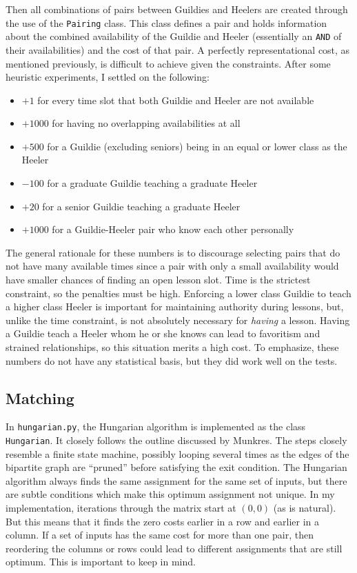 \documentclass[letterpaper]{article}
\begin{document}
Then all combinations of pairs between Guildies and Heelers are created through the use of the \texttt{Pairing} class. This class
defines a pair and holds information about the combined availability of the Guildie and Heeler (essentially an
\texttt{AND} of their availabilities) and the cost of that pair. A perfectly representational cost, as mentioned
previously, is difficult to achieve given the constraints. After some heuristic experiments, I settled on the following:

\begin{itemize}
    \item $+ 1$ for every time slot that both Guildie and Heeler are not available
    \item $+ 1000$ for having no overlapping availabilities at all
    \item $+ 500$ for a Guildie (excluding seniors) being in an equal or lower class as the Heeler
    \item $- 100$ for a graduate Guildie teaching a graduate Heeler
    \item $+ 20$ for a senior Guildie teaching a graduate Heeler
    \item $+ 1000$ for a Guildie-Heeler pair who know each other personally
\end{itemize}

The general rationale for these numbers is to discourage selecting pairs that do not have many available times since
a pair with only a small availability would have smaller chances of finding an open lesson slot. Time is the strictest
constraint, so the penalties must be high. Enforcing a lower class Guildie to teach a higher class Heeler is important
for maintaining authority during lessons, but, unlike the time constraint, is not absolutely necessary for
\textit{having} a lesson. Having a Guildie teach a Heeler whom he or she knows can lead to favoritism and strained
relationships, so this situation merits a high cost.
To emphasize, these numbers do not have any statistical basis, but they did work well on the
tests. 

\subsection{Matching}
In \texttt{hungarian.py}, the Hungarian algorithm is implemented as the class \texttt{Hungarian}. It closely follows the outline discussed by Munkres.
The steps closely resemble a finite state machine, possibly looping several times as the edges of the bipartite graph
are ``pruned'' before satisfying the exit condition. The Hungarian algorithm always finds the same assignment for the
same set of inputs, but there are subtle conditions which make this optimum assignment not unique. In my implementation,
iterations through the matrix start at $(0, 0)$ (as is natural). But this means that it finds the zero costs earlier in a
row and earlier in a column. If a set of inputs has the same cost for more than one pair, then reordering the columns or
rows could lead to different assignments that are still optimum. This is important to keep in mind.
\end{document}
